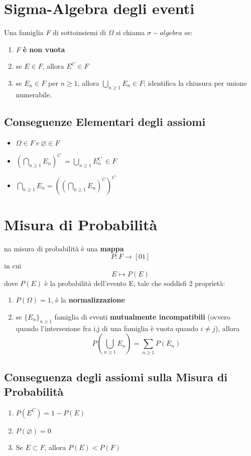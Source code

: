\documentclass{report}
\begin{document}
\section{Sigma-Algebra degli eventi}
Una famiglia \textit{F} di sottoinsiemi di \(\Omega\) si chiama \(\sigma-algebra\) se: \begin{enumerate}
    \item \textit{F} \textbf{è non vuota}
    \item se \(E \in \textit{F}\), allora \(E^C \in F\)
    \item se \(E_n \in \textit{F}\) per \(n \geq 1\), allora \(\bigcup_{n \geq 1} E_n \in F\); identifica la chiusura per unione numerabile.
\end{enumerate}
\subsection{Conseguenze Elementari degli assiomi}
\begin{itemize}
    \item \(\Omega \in \textit{F}\ e\ \varnothing \in \textit{F}\)
    \item \((\bigcap_{n \geq 1}E_n)^C\ = \bigcup_{n \geq 1}E_n^C\ \in \textit{F}\)
    \item \(\bigcap_{n \geq 1}E_n = ((\bigcap_{n \geq 1}E_n)^C)^C\)
\end{itemize}
\section{Misura di Probabilità}
na misura di probabilità è una \textbf{mappa} \[P: \textit{F} \longrightarrow [01]\] in cui \[E \longmapsto P(E)\] dove \(P(E)\) è la probabilità dell'evento E, tale che soddisfi 2 proprietà: \begin{enumerate}
    \item \(P(\Omega) = 1\), è la \textbf{normalizzazione}
    \item se \(\{E_n\}_{n \geq 1}\) famiglia di eventi \textbf{mutualmente incompatibili} (ovvero\\ quando l'intersezione fra i,j di una famiglia è vuota quando \(i \neq j\)), allora \[P(\bigcup_{n \geq 1}E_n) = \sum_{n \geq 1} P(E_n)\]
\end{enumerate}
\subsection{Conseguenza degli assiomi sulla Misura di Probabilità}
\begin{enumerate}
    \item \(P(E^C) = 1-P(E)\)
    \item \(P(\varnothing) = 0\)
    \item Se \(E \subset F\), allora \(P(E) < P(F)\)
\end{enumerate}
\end{document}

